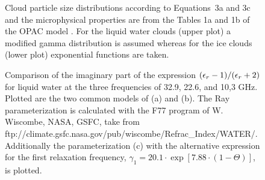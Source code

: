 \begin{figure}[!htb]
  \begin{center}
  \end{center}
  \caption[Cloud particle size distributions.]{Cloud particle size distributions according to 
    Equations~3a and 3c and the microphysical properties are from the 
    Tables 1a and 1b of the OPAC model \citep{hess:98}. 
    For the liquid water clouds (upper plot) a modified gamma 
    distribution is assumed whereas for the ice clouds (lower plot) 
    exponential functions are taken.}
  \label{fig:cloud_part_dist}
\end{figure}
%
%
\begin{figure}[!hbt]
  \begin{center}
  \end{center}
  \caption[Refractive index comparison.]{Comparison of the imaginary part of the expression 
    \mbox{$(\epsilon_r-1)/(\epsilon_r+2)$} for liquid water at the three 
    frequencies of 32.9, 22.6, and 10,3 GHz. Plotted are the two common
    models of \citet{liebeetal:91} (a) and \citet{ray:72} (b). 
    The Ray parameterization is calculated with the F77 program 
    of W. Wiscombe, NASA, GSFC, take from 
    ftp://climate.gsfc.nasa.gov/pub/wiscombe/Refrac\_Index/WATER/.
    Additionally the \citet{liebeetal:91} parameterization (c) with the 
    alternative expression for the first relaxation frequency, 
    $\gamma_1 = 20.1\cdot\exp{[7.88\cdot(1-\Theta)]}$, is plotted.}
%
  \label{fig:refrac_water_comp}
\end{figure}





